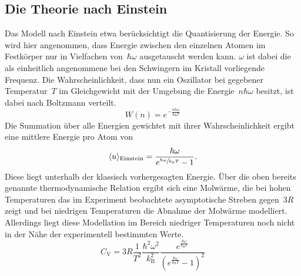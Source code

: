 \subsection{Die Theorie nach Einstein}
%
Das Modell nach Einstein etwa berücksichtigt die Quantisierung der Energie. So
wird hier angenommen, dass Energie zwischen den einzelnen Atomen im Festkörper
nur in Vielfachen von~$\hbar\omega$ ausgetauscht werden kann. $\omega$ ist dabei
die als einheitlich angenommene bei den Schwingern im Kristall vorliegende
Frequenz. Die Wahrscheinlichkeit, dass nun ein Oszillator bei gegebener
Temperatur~$T$ im Gleichgewicht mit der Umgebung die Energie~$n\hbar\omega$
besitzt, ist dabei nach Boltzmann verteilt.
%
\begin{equation}
  W(n)=e^{-\frac{n\hbar\omega}{k_{\mathrm{B}}T}}
\end{equation}
%
Die Summation über alle Energien gewichtet mit ihrer Wahrscheinlichkeit ergibt
eine mittlere Energie pro Atom von
%
\begin{equation}
  \langle u\rangle_\text{Einstein}=\frac{\hbar\omega}{e^{\sfrac{\hbar\omega}{k_{\mathrm{B}}T}}-1}.
\end{equation}
%
Diese liegt unterhalb der klassisch vorhergesagten Energie. Über die oben
bereits genannte thermodynamische Relation ergibt sich eine Molwärme, die bei
hohen Temperaturen das im Experiment beobachtete asymptotische Streben
gegen~$3R$ zeigt und bei niedrigen Temperaturen die Abnahme der Molwärme
modelliert. Allerdings liegt diese Modellation im Bereich niedriger Temperaturen
noch nicht in der Nähe der experimentell bestimmten Werte.
%
\begin{equation}
  C_{\mathrm{V}}=3R\frac{1}{T^2}\frac{\hbar^2\omega^2}{k_{\mathrm{B}}^2}\frac{e^{\frac{\hbar\omega}{k_{\mathrm{B}}T}}}{(e^{\frac{\hbar\omega}{k_{\mathrm{B}}T}}-1)^2}
\end{equation}
%
